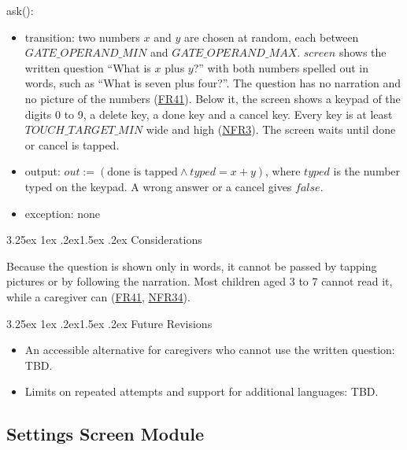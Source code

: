 \documentclass[10pt, titlepage]{article}
\makeatletter
\newcommand{\srsurl}{https://team-hindsight.github.io/ophthamology-game/SRS/SRS.pdf}
\newcommand{\srsitemref}[2]{\href{\srsurl\#nameddest=#1}{#2}}
\renewcommand\paragraph{\@startsection{paragraph}{4}{\z@}%
  {3.25ex \@plus 1ex \@minus .2ex}{1.5ex \@plus .2ex}%
  {\normalfont\normalsize\bfseries}}
\newcommand{\T}[1]{\mathit{#1}}          %
\newcommand{\out}{\mathit{out}}
\newcommand{\false}{\mathit{false}}
\makeatother
\begin{document}
\begin{samepage}
\noindent ask():
\begin{itemize}
\item transition: two numbers $x$ and $y$ are chosen at random, each between
  $\T{GATE\_OPERAND\_MIN}$ and $\T{GATE\_OPERAND\_MAX}$. $\T{screen}$ shows the
  written question ``What is $x$ plus $y$?'' with both numbers spelled out in
  words, such as ``What is seven plus four?''. The question has no narration
  and no picture of the numbers (\srsitemref{FR_ParentGate}{FR41}). Below it,
  the screen shows a keypad of the digits 0 to 9, a delete key, a done key and
  a cancel key. Every key is at least $\T{TOUCH\_TARGET\_MIN}$ wide and high
  (\srsitemref{NFR_TouchTarget}{NFR3}). The screen waits until done or cancel
  is tapped.
\item output: $\out := (\text{done is tapped} \wedge \T{typed} = x + y)$,
  where $\T{typed}$ is the number typed on the keypad. A wrong answer or a
  cancel gives $\false$.
\item exception: none
\end{itemize}
\end{samepage}
\par\pagebreak[0]

\paragraph{Considerations}

Because the question is shown only in words, it cannot be passed by tapping
pictures or by following the narration. Most children aged 3 to 7 cannot read
it, while a caregiver can (\srsitemref{FR_ParentGate}{FR41},
\srsitemref{NFR_StoreCompliance}{NFR34}).

\paragraph{Future Revisions}

\begin{itemize}
\item An accessible alternative for caregivers who cannot use the written question: TBD.
\item Limits on repeated attempts and support for additional languages: TBD.
\end{itemize}

\newpage
\subsection{Settings Screen Module} \label{mis:Settings}
\end{document}
